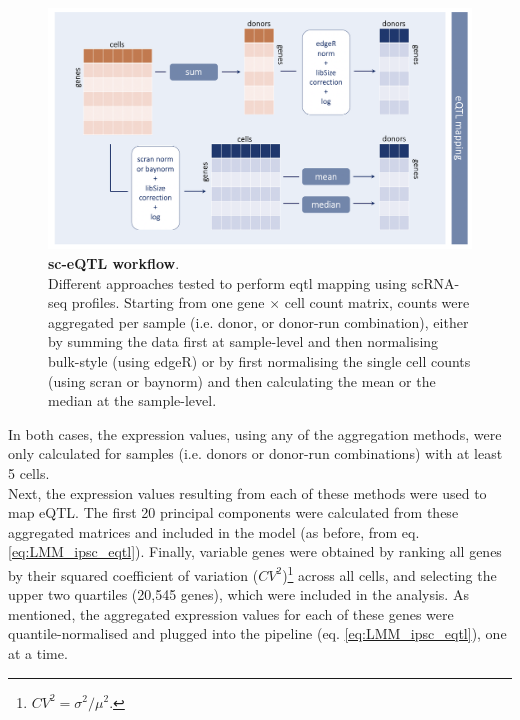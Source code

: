 \begin{figure}[h]
\centering
\includegraphics[width=16cm]{Chapter3/Fig/sc_qtl_workflow_no1_2_steps.png}
\caption[sc-eQTL workflow]{\textbf{sc-eQTL workflow}.\\
Different approaches tested to perform \gls{eqtl} mapping using scRNA-seq profiles.
Starting from one gene $\times$ cell count matrix, counts were aggregated per sample (i.e. donor, or donor-run combination), either by summing the data first at sample-level and then normalising bulk-style (using edgeR) or by first normalising the single cell counts (using scran or baynorm) and then calculating the mean or the median at the sample-level. }
\label{fig:sc_qtl_workflow}
\end{figure}

In both cases, the expression values, using any of the aggregation methods, were only calculated for samples (i.e. donors or donor-run combinations) with at least 5 cells.\\

Next, the expression values resulting from each of these methods were used to map eQTL.
The first 20 principal components were calculated from these aggregated matrices and included in the model (as before, from eq. \eqref{eq:LMM_ipsc_eqtl}).
Finally, variable genes were obtained by ranking all genes by their squared coefficient of variation ($CV^2$)\footnote{$CV^2=\sigma^2/\mu^2$.} across all cells, and selecting the upper two quartiles (20,545 genes), which were included in the analysis. 
As mentioned, the aggregated expression values for each of these genes were quantile-normalised and plugged into the pipeline (eq. \eqref{eq:LMM_ipsc_eqtl}), one at a time. \\

